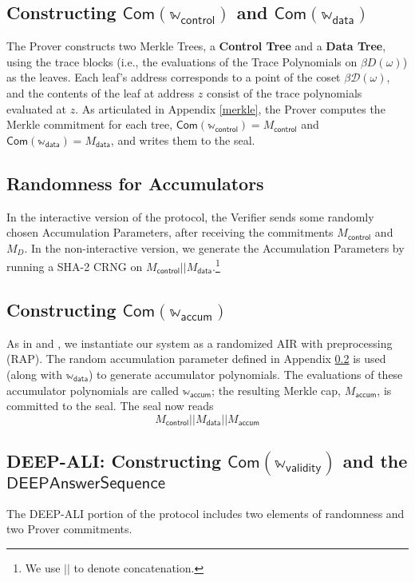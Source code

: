 \documentclass[10pt,letterpaper,titlepage]{article}
\newcommand{\w}[0]{\omega}
\newcommand{\D}[0]{\mathcal{D}}
\theoremstyle{definition}
\begin{document}
\begin{appendices}
\subsection{Constructing $\mathsf{Com}(\mathbb{w}_\mathsf{control})$ and $\mathsf{Com}(\mathbb{w}_\mathsf{data})$}
\label{merkle trace}
The Prover constructs two Merkle Trees, a \textbf{Control Tree} and a \textbf{Data Tree}, using the trace blocks (i.e., the evaluations of the Trace Polynomials on $\beta D(\w)$) as the leaves.
Each leaf's address corresponds to a point of the coset $\beta\D(\w)$, and the contents of the leaf at address $z$ consist of the trace polynomials evaluated at $z$.
As articulated in Appendix \ref{merkle}, the Prover computes the Merkle commitment for each tree, $\mathsf{Com}(\mathbb{w}_\mathsf{control})=M_\mathsf{control}$ and $\mathsf{Com}(\mathbb{w}_\mathsf{data})=M_\mathsf{data}$, and writes them to the seal.

\subsection{Randomness for Accumulators}
\label{accum randomness}
In the interactive version of the protocol, the Verifier sends some randomly chosen Accumulation Parameters, after receiving the commitments $M_\mathsf{control}$ and $M_{D}$.
In the non-interactive version, we generate the Accumulation Parameters by running a SHA-2 CRNG on $M_\mathsf{control}||M_\mathsf{data}$.\footnote{We use $||$ to denote concatenation.}

\subsection{Constructing $\mathsf{Com}(\mathbb{w}_\mathsf{accum})$ }
\label{committing accum}
As in \cite{cairo} and \cite{RAP}, we instantiate our system as a randomized AIR with preprocessing (RAP).
The random accumulation parameter defined in Appendix \ref{accum randomness} is used (along with $\mathbb{w}_\mathsf{data}$) to generate accumulator polynomials.
The evaluations of these accumulator polynomials are called $\mathbb{w}_\mathsf{accum}$; the resulting Merkle cap, $M_\mathsf{accum}$, is committed to the seal.
The seal now reads
\[
  M_\mathsf{control}||
  M_\mathsf{data}||
  M_\mathsf{accum}
\]

\subsection{DEEP-ALI: Constructing $\mathsf{Com}(\mathbb{w}_\mathsf{validity})$ and the $\mathsf{DEEPAnswerSequence}$}
The DEEP-ALI portion of the protocol includes two elements of randomness and two Prover commitments.

\end{appendices}
\end{document}
